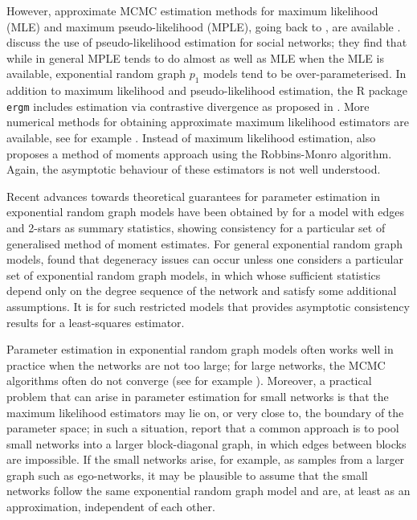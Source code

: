 \documentclass{article}
\begin{document}
However, approximate MCMC estimation methods for  maximum likelihood (MLE) and maximum pseudo-likelihood (MPLE), going back to \cite{besag1974spatial}, are available 
\cite{ergm, ergmmulti, ergm_new}. \cite{strauss1990pseudolikelihood} discuss the use of pseudo-likelihood estimation for social networks; they find that while in general MPLE tends to do almost as well as MLE when the MLE is available, exponential random graph $p_1$ models tend to be over-parameterised. In addition to  maximum likelihood and pseudo-likelihood estimation, the R package {\tt ergm} includes estimation via contrastive divergence as proposed in \cite{asuncion2010learning}. More numerical methods for obtaining approximate maximum likelihood estimators are available, see for example  \cite{snijders2002markov,  stivala2020exponential}. 
Instead of maximum likelihood estimation, \cite{snijders2002markov} also proposes a method of moments approach using the Robbins-Monro algorithm. Again, the asymptotic behaviour of these estimators is not well understood. 


Recent advances towards theoretical guarantees for parameter estimation in exponential random graph models have been obtained by \cite{mukherjee2013statistics} for a model with edges and 2-stars as summary statistics, showing consistency for a particular set of generalised method of moment estimates. For general exponential random graph models, 
\cite{mukherjee2020degeneracy}  found that degeneracy issues can occur unless one considers a particular set of exponential random graph models, in which whose sufficient statistics depend only on the degree sequence of the network and satisfy some additional assumptions. It is for such restricted models that \cite{mukherjee2020degeneracy}  provides asymptotic consistency results for a least-squares estimator. 



Parameter estimation in exponential random graph models often works well in practice when the networks are not too large; for large networks, the MCMC algorithms often do not converge (see for example \cite{stivala2020exponential}). Moreover, a practical problem that can arise in parameter estimation for small networks is that the maximum likelihood estimators may lie on, or very close to,  the boundary of the parameter space; in such a situation, \cite{yon2021exponential} report that a common approach is to pool small networks into a larger block-diagonal graph, in which edges between blocks are impossible.
If the small networks arise, for example, as samples from a larger graph such as ego-networks, it may be plausible to assume that the small networks follow the same exponential random graph model and are, at least as an approximation, independent of each other.
\end{document}
